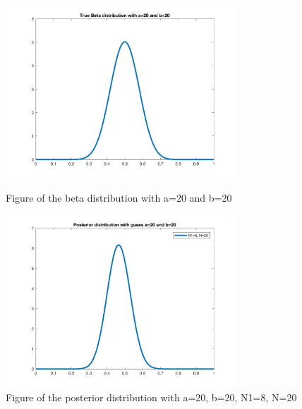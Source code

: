 \documentclass[a4paper]{article}
\begin{document}
\begin{spacing}{2.0}
\begin{enumerate}[(1)]
\begin{figure}[htbp]
\begin{minipage}[t]{0.5\linewidth}
\centering
\includegraphics[width=3.4in]{Pbeta1.jpg}
\caption{Figure of the beta distribution with a=20 and b=20}
\label{beta1}
\end{minipage}
\begin{minipage}[t]{0.5\linewidth}
\centering
\includegraphics[width=3.4in]{posterior1.jpg}
\caption{Figure of the posterior distribution with a=20, b=20, N1=8, N=20}
\label{posterior1}
\end{minipage}
\end{figure}


\end{enumerate}
\end{spacing}
\end{document}
